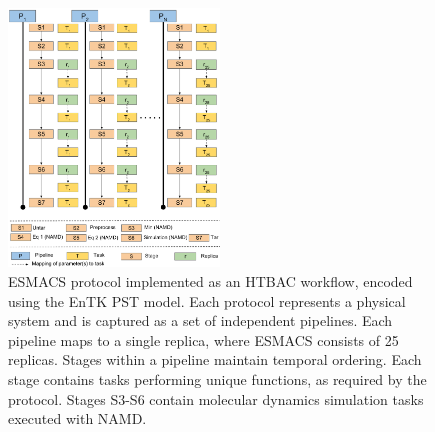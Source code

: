\begin{figure}
\centering
  \includegraphics[width=0.5\textwidth]{FIGURES/HTBAC_Workflow_ESMACS.pdf}
  \caption{ESMACS protocol implemented as an HTBAC workflow, encoded using
  the EnTK PST model. Each protocol represents a physical system and is
  captured as a set of independent pipelines. Each pipeline maps to a single
  replica, where ESMACS consists of 25 replicas. 
  Stages within a pipeline maintain temporal ordering. Each stage
  contains tasks performing unique functions, as required by the protocol. 
  Stages S3-S6 contain molecular dynamics simulation tasks executed with NAMD.}
  \label{figure:HTBAC}
\end{figure}




